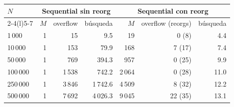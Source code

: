 \begin{tabular}{@{}lrrrrrr@{}}
\toprule
$N$ & \multicolumn{3}{c}{Sequential sin reorg} & \multicolumn{3}{c}{Sequential con reorg} \\
\cmidrule(lr){2-4}\cmidrule(l){5-7}
 & $M$ & overflow & búsqueda & $M$ & overflow (reorgs) & búsqueda \\
\midrule
1\,000 & 1 & 15 & 9.5 & 19 & 0 (8) & 4.4 \\
10\,000 & 1 & 153 & 79.9 & 168 & 7 (17) & 7.4 \\
50\,000 & 1 & 769 & 394.3 & 957 & 0 (25) & 9.9 \\
100\,000 & 1 & 1\,538 & 742.2 & 2\,064 & 0 (28) & 11.0 \\
250\,000 & 1 & 3\,846 & 1\,742.6 & 4\,509 & 8 (32) & 12.2 \\
500\,000 & 1 & 7\,692 & 4\,026.3 & 9\,045 & 22 (35) & 13.1 \\
\bottomrule
\end{tabular}
